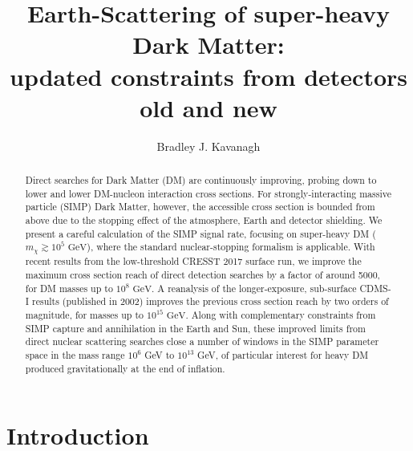 \documentclass[prd,twocolumn,showpacs,nofootinbib,aps]{revtex4-1}
\begin{document}
\title{Earth-Scattering of super-heavy Dark Matter: \\updated constraints from detectors old and new}
\author{Bradley J. Kavanagh}


\begin{abstract}
Direct searches for Dark Matter (DM) are continuously improving, probing down to lower and lower DM-nucleon interaction cross sections. For strongly-interacting massive particle (SIMP) Dark Matter, however, the accessible cross section is bounded from above due to the stopping effect of the atmosphere, Earth and detector shielding. We present a careful calculation of the SIMP signal rate, focusing on super-heavy DM ($m_\chi \gtrsim 10^5 \,\,\mathrm{GeV}$), where the standard nuclear-stopping formalism is applicable. With recent results from the low-threshold CRESST 2017 surface run, we improve the maximum cross section reach of direct detection searches by a factor of around 5000, for DM masses up to $10^8 \,\,\mathrm{GeV}$. A reanalysis of the longer-exposure, sub-surface CDMS-I results (published in 2002) improves the previous cross section reach by two orders of magnitude, for masses up to $10^{15} \,\,\mathrm{GeV}$. Along with complementary constraints from SIMP capture and annihilation in the Earth and Sun, these improved limits from direct nuclear scattering searches close a number of windows in the SIMP parameter space in the mass range $10^6$ GeV to $10^{13}$ GeV, of particular interest for heavy DM produced gravitationally at the end of inflation.

 
\end{abstract}


\maketitle

\section{Introduction}
\label{sec:introduction}
\end{document}
